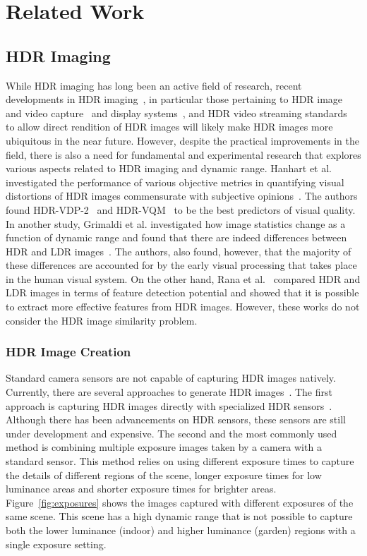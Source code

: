 \chapter{Related Work}
\label{chp:b2}

\section{HDR Imaging}

While HDR imaging has long been an active field of research, recent developments in HDR imaging~\cite{Rein2010,Banterle2011,chalmers2016high}, in particular those pertaining to HDR image and video capture~\cite{tocci2011versatile,froehlich2014creating} and display systems~\cite{seetzen2004high}, and HDR
video streaming standards~\cite{standard2016dynamic} to allow direct rendition of HDR images will likely make HDR images more ubiquitous in the near future. However, despite the practical improvements in the field, there is also a need for fundamental and experimental research that explores various aspects related to HDR imaging and dynamic range. Hanhart et al. investigated the performance of various objective metrics in quantifying visual distortions of HDR images commensurate with subjective opinions~\cite{hanhart2015benchmarking}. The authors found HDR-VDP-2~\cite{mantiuk2011hdr} and HDR-VQM~\cite{narwaria2015hdr} to be the best predictors of visual quality. In another study, Grimaldi et al. investigated how image statistics change as a function of dynamic range and found that there are indeed differences between HDR and LDR images~\cite{grimaldi2019statistics}. The authors, also found, however, that the majority of these differences are accounted for by the early visual processing that takes place in the human visual system. On the other hand, Rana et al.~\cite{rana2015evaluation} compared HDR and LDR images in terms of feature detection potential and showed that it is possible to extract more effective features from HDR images. However, these works do not consider the HDR image similarity problem.

\subsection{HDR Image Creation}
Standard camera sensors are not capable of capturing HDR images natively. Currently, there are several approaches to generate HDR images~\cite{banterle2017advanced}. The first approach is capturing HDR images directly with specialized HDR sensors~\cite{zhao2015unbounded}. Although there has been advancements on HDR sensors, these sensors are still under development and expensive. The second and the most commonly used method is combining multiple exposure images taken by a camera with a standard sensor. This method relies on using different exposure times to capture the details of different regions of the scene, longer exposure times for low luminance areas and shorter exposure times for brighter areas. Figure~\ref{fig:exposures} shows the images captured with different exposures of the same scene. This scene has a high dynamic range that is not possible to capture both the lower luminance (indoor) and higher luminance (garden) regions with a single exposure setting.

